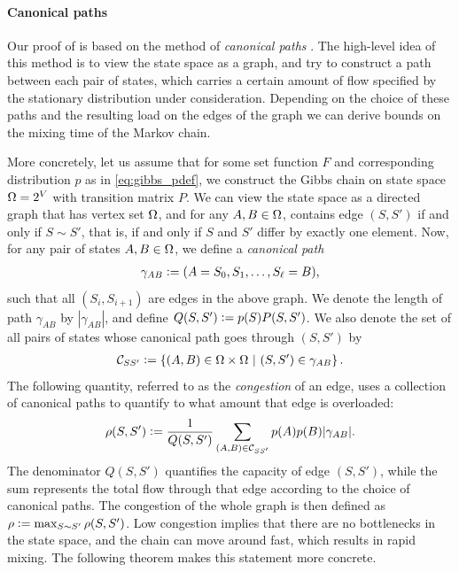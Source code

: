 \paragraph{Canonical paths}
Our proof of  is based on the method of \emph{canonical paths} \citep{jerrum03,sinclair92,jerrum89,diaconis91}.
The high-level idea of this method is to view the state space as a graph, and try to construct a path between each pair of states, which carries a certain amount of flow specified by the stationary distribution under consideration.
Depending on the choice of these paths and the resulting load on the edges of the graph we can derive bounds on the mixing time of the Markov chain.

More concretely, let us assume that for some set function $F$ and corresponding distribution $p$ as in \eqref{eq:gibbs_pdef}, we construct the Gibbs chain on state space $\ss = 2^V$ with transition matrix $P$.
We can view the state space as a directed graph that has vertex set $\ss$, and for any $A, B \in \ss$, contains edge $(S, S')$ if and only if $S \sim S'$, that is, if and only if $S$ and $S'$ differ by exactly one element.
Now, for any pair of states $A, B \in \ss$, we define a \emph{canonical path}
\begin{align*}
\gamma_{AB} \defeq (A = S_0, S_1, \ldots, S_{\ell} = B),
\end{align*}
such that all $(S_i, S_{i+1})$ are edges in the above graph.
We denote the length of path $\gamma_{AB}$ by $|\gamma_{AB}|$, and define $Q(S, S') \defeq p(S) P(S, S')$.
We also denote the set of all pairs of states whose canonical path goes through $(S, S')$ by
\begin{align*}
\mathcal{C}_{SS'} \defeq \sdef{(A, B) \in \ss \times \ss}{(S, S') \in \gamma_{AB}}.
\end{align*}
The following quantity, referred to as the \emph{congestion} of an edge, uses a collection of canonical paths to quantify to what amount that edge is overloaded:
\begin{align} \label{eq:cong}
  \rho(S, S') \defeq \frac{1}{Q(S, S')} \sum_{(A, B) \in \mathcal{C}_{SS'}} p(A) p(B) |\gamma_{AB}|.
\end{align}
The denominator $Q(S, S')$ quantifies the capacity of edge $(S, S')$, while the sum represents the total flow through that edge according to the choice of canonical paths.
The congestion of the whole graph is then defined as $\rho \defeq \max_{S \sim S'}\rho(S, S')$.
Low congestion implies that there are no bottlenecks in the state space, and the chain can move around fast, which results in rapid mixing.
The following theorem makes this statement more concrete.

